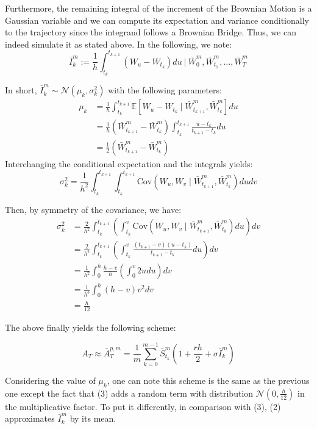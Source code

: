 \documentclass{article}
\begin{document}
Furthermore, the remaining integral of the increment of the Brownian Motion is a Gaussian variable and we can
compute its expectation and variance conditionally to the trajectory since the integrand follows a Brownian Bridge.
Thus, we can indeed simulate it as stated above. In the following, we note:
\[
	\bar I_k^m := \frac{1}{h}
	\int_{t_k}^{t_{k+1}} \left( W_u - W_{t_k} \right) du \ \Big\vert \ \bar W_0^m, \bar W_{t_1}^m, \dots, \bar W_T^m
\]

In short, $\bar I_k^m \sim \mathcal N(\mu_k, \sigma_k^2)$ with the following parameters:
\begin{align*}
	\mu_k
	&= \frac{1}{h} \int_{t_k}^{t_{k+1}} \mathbb E \left[ W_u - W_{t_k} \mid \bar W_{t_{k+1}}^m, \bar W_{t_k}^m \right] du \\
	&= \frac{1}{h} \left( \bar W_{t_{k+1}}^m - \bar W_{t_k}^m \right) \int_{t_k}^{t_{k+1}} \frac{u - t_k}{t_{k+1} - t_k} du \\
	&= \frac{1}{2} \left( \bar W_{t_{k+1}}^m - \bar W_{t_k}^m \right)
\end{align*}
Interchanging the conditional expectation and the integrals yields:
\[
	\sigma_k^2 = \frac{1}{h^2} \int_{t_k}^{t_{k+1}} \int_{t_k}^{t_{k+1}}
		\mathrm{Cov} \left( W_u, W_v \mid \bar W_{t_{k+1}}^m, \bar W_{t_k}^m \right) du dv 
\]

\noindent Then, by symmetry of the covariance, we have:
\begin{align*}
	\sigma_k^2 &= \frac{2}{h^2} \int_{t_k}^{t_{k+1}} \left( \int_{t_k}^{v}
		\mathrm{Cov} \left( W_u, W_v \mid \bar W_{t_{k+1}}^m, \bar W_{t_k}^m \right) du \right) dv 
	 \\
	&= \frac{2}{h^2} \int_{t_k}^{t_{k+1}} \left( \int_{t_k}^{v} \frac{(t_{k+1} - v)(u - t_k)}{t_{k+1} - t_k} du \right) dv \\
	&= \frac{1}{h^2} \int_{0}^{h} \frac{h - v}{h} \left( \int_{0}^{v} 2u du \right) dv \\
	&= \frac{1}{h^3} \int_{0}^{h} (h - v) v^2 dv \\
	&= \frac{h}{12}
\end{align*}

The above finally yields the following scheme:

\begin{equation}
    A_T \approx \bar A_T^{p, m} = \frac{1}{m} \sum_{k=0}^{m-1}
    	\bar S_{t_k}^m \left( 1 + \frac{rh}{2} + \sigma \bar I_k^m \right) \tag{3}
\end{equation}

Considering the value of $\mu_k$, one can note this scheme is the same as the previous one except the fact
that (3) adds a random term with distribution $\mathcal N(0, \frac{h}{12})$ in the multiplicative factor.
To put it differently, in comparison with (3), (2) approximates $\bar I_k^m$ by its mean.
\end{document}
